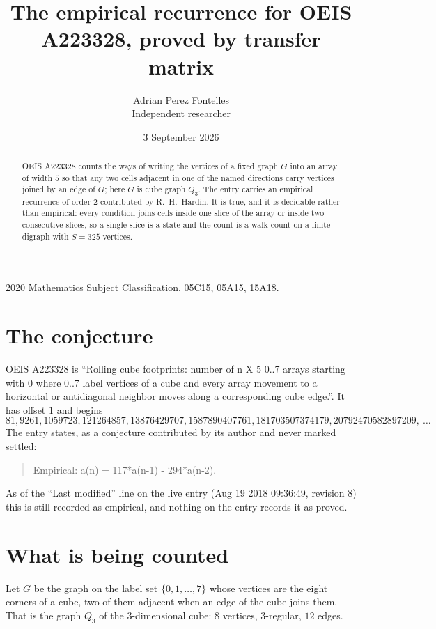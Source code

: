 \documentclass[11pt,a4paper]{article}
\title{The empirical recurrence for OEIS A223328, proved by transfer matrix}
\author{Adrian Perez Fontelles\\ \small Independent researcher}
\date{3 September 2026}
\theoremstyle{plain}
\theoremstyle{definition}
\begin{document}
\maketitle

\begin{abstract}
OEIS A223328 counts the ways of writing the vertices of a fixed graph $G$ into an array of width
$5$ so that any two cells adjacent in one of the named directions carry vertices joined by an
edge of $G$; here $G$ is cube graph $Q_3$. The entry carries an empirical recurrence of order $2$
contributed by R.~H.~Hardin. It is true, and it is decidable rather than empirical: every
condition joins cells inside one slice of the array or inside two consecutive slices, so a
single slice is a state and the count is a walk count on a finite digraph with $S=325$ vertices.
\end{abstract}

\noindent\small 2020 Mathematics Subject Classification. 05C15, 05A15, 15A18.\normalsize

\section{The conjecture}

OEIS A223328 is ``Rolling cube footprints: number of n X 5 0..7 arrays starting with 0 where 0..7 label vertices of a cube and every array movement to a horizontal or antidiagonal neighbor moves along a corresponding cube edge.''. It has offset $1$ and begins
\[
81, 9261, 1059723, 121264857, 13876429707, 1587890407761, 181703507374179, 20792470582897209,\ \dots
\]
The entry states, as a conjecture contributed by its author and never marked settled:
\begin{quote}
Empirical: a(n) = 117*a(n-1) - 294*a(n-2).
\end{quote}
As of the ``Last modified'' line on the live entry (Aug 19 2018 09:36:49, revision 8) this is still
recorded as empirical, and nothing on the entry records it as proved.

\section{What is being counted}

Let $G$ be the graph on the label set $\{0,1,\dots,7\}$ whose vertices are the eight corners of a cube, two of them adjacent when an edge of the cube joins them. That is the graph $Q_3$ of the $3$-dimensional cube: $8$ vertices, $3$-regular, $12$ edges.
\end{document}
